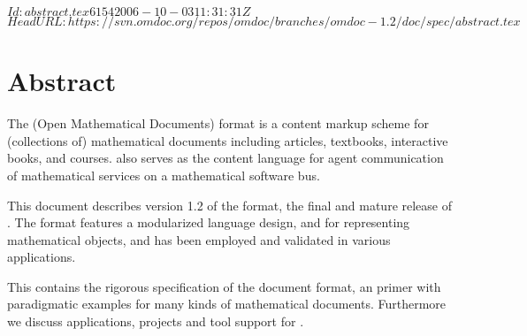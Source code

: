 \svnInfo $Id: abstract.tex 6154 2006-10-03 11:31:31Z  $
\svnKeyword $HeadURL: https://svn.omdoc.org/repos/omdoc/branches/omdoc-1.2/doc/spec/abstract.tex $

\section*{Abstract}
The {\omdoc} (Open Mathematical Documents) format is a content markup scheme for
(collections of) mathematical documents including articles, textbooks, interactive
books, and courses.  {\omdoc} also serves as the content language for agent
communication of mathematical services on a mathematical software bus.

This document describes version 1.2 of the {\omdoc} format, the final and mature
release of {}. The format features a modularized language design,
{\openmath} and {\mathml} for representing mathematical objects, and has been
employed and validated in various applications.

This {\report} contains the rigorous specification of the {\omdoc} document format, an
{\omdoc} primer with paradigmatic examples for many kinds of mathematical documents.
Furthermore we discuss applications, projects and tool support for {\omdoc}.


